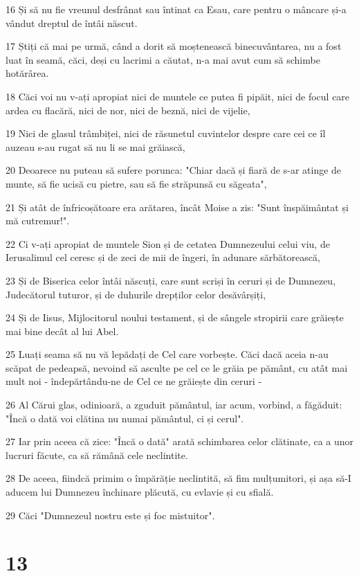 \par 16 Și să nu fie vreunul desfrânat sau întinat ca Esau, care pentru o mâncare și-a vândut dreptul de întâi născut.
\par 17 Știți că mai pe urmă, când a dorit să moștenească binecuvântarea, nu a fost luat în seamă, căci, deși cu lacrimi a căutat, n-a mai avut cum să schimbe hotărârea.
\par 18 Căci voi nu v-ați apropiat nici de muntele ce putea fi pipăit, nici de focul care ardea cu flacără, nici de nor, nici de beznă, nici de vijelie,
\par 19 Nici de glasul trâmbiței, nici de răsunetul cuvintelor despre care cei ce îl auzeau s-au rugat să nu li se mai grăiască,
\par 20 Deoarece nu puteau să sufere porunca: "Chiar dacă și fiară de s-ar atinge de munte, să fie ucisă cu pietre, sau să fie străpunsă cu săgeata",
\par 21 Și atât de înfricoșătoare era arătarea, încât Moise a zis: "Sunt înspăimântat și mă cutremur!".
\par 22 Ci v-ați apropiat de muntele Sion și de cetatea Dumnezeului celui viu, de Ierusalimul cel ceresc și de zeci de mii de îngeri, în adunare sărbătorească,
\par 23 Și de Biserica celor întâi născuți, care sunt scriși în ceruri și de Dumnezeu, Judecătorul tuturor, și de duhurile drepților celor desăvârșiți,
\par 24 Și de Iisus, Mijlocitorul noului testament, și de sângele stropirii care grăiește mai bine decât al lui Abel.
\par 25 Luați seama să nu vă lepădați de Cel care vorbește. Căci dacă aceia n-au scăpat de pedeapsă, nevoind să asculte pe cel ce le grăia pe pământ, cu atât mai mult noi - îndepărtându-ne de Cel ce ne grăiește din ceruri -
\par 26 Al Cărui glas, odinioară, a zguduit pământul, iar acum, vorbind, a făgăduit: "Încă o dată voi clătina nu numai pământul, ci și cerul".
\par 27 Iar prin aceea că zice: "Încă o dată" arată schimbarea celor clătinate, ca a unor lucruri făcute, ca să rămână cele neclintite.
\par 28 De aceea, fiindcă primim o împărăție neclintită, să fim mulțumitori, și așa să-I aducem lui Dumnezeu închinare plăcută, cu evlavie și cu sfială.
\par 29 Căci "Dumnezeul nostru este și foc mistuitor".

\chapter{13}

